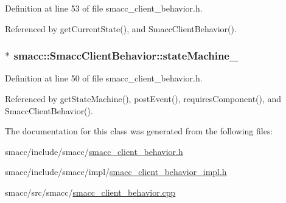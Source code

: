 Definition at line 53 of file smacc\+\_\+client\+\_\+behavior.\+h.



Referenced by get\+Current\+State(), and Smacc\+Client\+Behavior().

\subsubsection[{\texorpdfstring{state\+Machine\+\_\+}{stateMachine_}}]{$\ast$ smacc\+::\+Smacc\+Client\+Behavior\+::state\+Machine\+\_\+\hspace{0.3cm}{\ttfamily [private]}}\hypertarget{classsmacc_1_1SmaccClientBehavior_a7950b5684d6de0a8e8959c0936ce9a19}{}\label{classsmacc_1_1SmaccClientBehavior_a7950b5684d6de0a8e8959c0936ce9a19}


Definition at line 50 of file smacc\+\_\+client\+\_\+behavior.\+h.



Referenced by get\+State\+Machine(), post\+Event(), requires\+Component(), and Smacc\+Client\+Behavior().



The documentation for this class was generated from the following files\+:\begin{DoxyCompactItemize}
\item 
smacc/include/smacc/\hyperlink{smacc__client__behavior_8h}{smacc\+\_\+client\+\_\+behavior.\+h}\item 
smacc/include/smacc/impl/\hyperlink{smacc__client__behavior__impl_8h}{smacc\+\_\+client\+\_\+behavior\+\_\+impl.\+h}\item 
smacc/src/smacc/\hyperlink{smacc__client__behavior_8cpp}{smacc\+\_\+client\+\_\+behavior.\+cpp}\end{DoxyCompactItemize}
